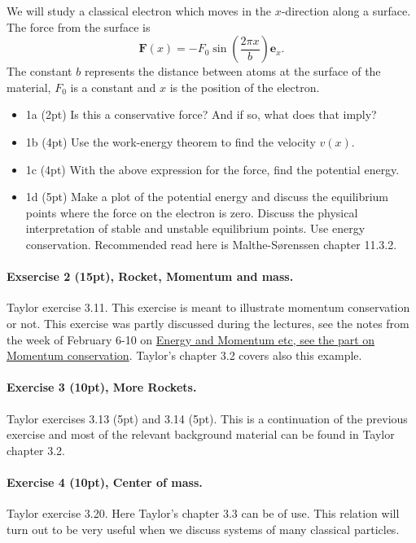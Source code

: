\documentclass[%
oneside,                 %
final,                   %
10pt]{article}
\begin{document}
We will study a classical electron which moves in the $x$-direction along a surface. The force from the surface is
\[
\bm{F}(x)=-F_0\sin{(\frac{2\pi x}{b})}\bm{e}_x.
\]
The constant $b$ represents the distance between atoms at the surface of the material, $F_0$ is a constant and $x$ is the position of the electron.

\begin{itemize}
\item 1a (2pt) Is this a conservative force? And if so, what does that imply?

\item 1b (4pt) Use the work-energy theorem to find the velocity $v(x)$. 

\item 1c (4pt) With the above expression for the force, find the potential energy.

\item 1d (5pt) Make a plot of the potential energy and discuss the equilibrium points where the force on the electron is zero. Discuss the physical interpretation of stable and unstable equilibrium points. Use energy conservation. Recommended read here  is Malthe-Sørenssen chapter 11.3.2.
\end{itemize}

\noindent
\paragraph{Exsercise 2 (15pt), Rocket, Momentum and mass.}
Taylor exercise 3.11.   This exercise is meant to illustrate momentum conservation or not. 
This exercise was partly discussed during the lectures, see the notes from the week of February 6-10  on \href{{https://mhjensen.github.io/Physics321/doc/pub/week6/html/week6.html}}{Energy and Momentum etc, see the part on Momentum conservation}. Taylor's chapter 3.2 covers also this example.

\paragraph{Exercise 3 (10pt), More Rockets.}
Taylor exercises 3.13 (5pt) and 3.14 (5pt). This is a continuation of
the previous exercise and most of the relevant background material can
be found in Taylor chapter 3.2.

\paragraph{Exercise 4 (10pt), Center of mass.}
Taylor exercise 3.20. Here Taylor's chapter 3.3 can be of use. This
relation will turn out to be very useful when we discuss systems of
many classical particles.
\end{document}
